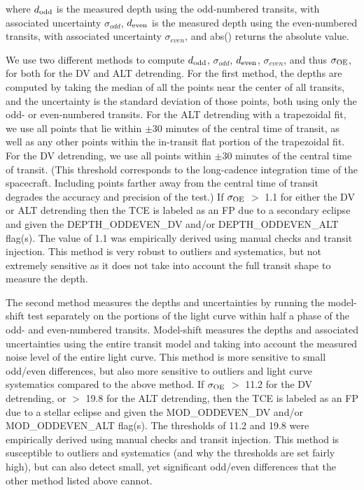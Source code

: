 \noindent where $d_{\rm odd}$ is the measured depth using the odd-numbered transits, with associated uncertainty $\sigma_{odd}$, $d_{\rm even}$ is the measured depth using the even-numbered transits, with associated uncertainty $\sigma_{even}$, and abs() returns the absolute value.

We use two different methods to compute $d_{\rm odd}$, $\sigma_{odd}$, $d_{\rm even}$, $\sigma_{even}$, and thus $\sigma_{\rm OE}$, for both for the DV and ALT detrending. For the first method, the depths are computed by taking the median of all the points near the center of all transits, and the uncertainty is the standard deviation of those points, both using only the odd- or even-numbered transits. For the ALT detrending with a trapezoidal fit, we use all points that lie within $\pm$30 minutes of the central time of transit, as well as any other points within the in-transit flat portion of the trapezoidal fit. For the DV detrending, we use all points within $\pm$30 minutes of the central time of transit. (This threshold corresponds to the long-cadence integration time of the \kepler{} spacecraft. Including points farther away from the central time of transit degrades the accuracy and precision of the test.) If $\sigma_{\rm OE}$ $>$ 1.1 for either the DV or ALT detrending then the TCE is labeled as an FP due to a secondary eclipse and given the DEPTH\_ODDEVEN\_DV and/or DEPTH\_ODDEVEN\_ALT flag(s). The value of 1.1 was empirically derived using manual checks and transit injection. This method is very robust to outliers and systematics, but not extremely sensitive as it does not take into account the full transit shape to measure the depth.

The second method measures the depths and uncertainties by running the model-shift test separately on the portions of the light curve within half a phase of the odd- and even-numbered transits. Model-shift measures the depths and associated uncertainties using the entire transit model and taking into account the measured noise level of the entire light curve. This method is more sensitive to small odd/even differences, but also more sensitive to outliers and light curve systematics compared to the above method. If $\sigma_{\rm OE}$ $>$ 11.2 for the DV detrending, or $>$ 19.8 for the ALT detrending, then the TCE is labeled as an FP due to a stellar eclipse and given the MOD\_ODDEVEN\_DV and/or MOD\_ODDEVEN\_ALT flag(s). The thresholds of 11.2 and 19.8 were empirically derived using manual checks and transit injection. This method is susceptible to outliers and systematics (and why the thresholds are set fairly high), but can also detect small, yet significant odd/even differences that the other method listed above cannot.


